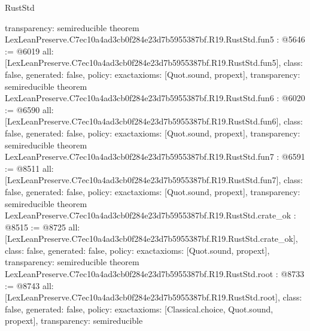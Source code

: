\begin{lexlean}{RustStd}
\begin{coremodule}
{  transparency: semireducible
}
theorem LexLeanPreserve.C7ec10a4ad3cb0f284e23d7b5955387bf.R19.RustStd.fun5 : @5646 := @6019 {
  all: [LexLeanPreserve.C7ec10a4ad3cb0f284e23d7b5955387bf.R19.RustStd.fun5],
  class: false,
  generated: false,
  policy: exact{axioms: [Quot.sound, propext]},
  transparency: semireducible
}
theorem LexLeanPreserve.C7ec10a4ad3cb0f284e23d7b5955387bf.R19.RustStd.fun6 : @6020 := @6590 {
  all: [LexLeanPreserve.C7ec10a4ad3cb0f284e23d7b5955387bf.R19.RustStd.fun6],
  class: false,
  generated: false,
  policy: exact{axioms: [Quot.sound, propext]},
  transparency: semireducible
}
theorem LexLeanPreserve.C7ec10a4ad3cb0f284e23d7b5955387bf.R19.RustStd.fun7 : @6591 := @8511 {
  all: [LexLeanPreserve.C7ec10a4ad3cb0f284e23d7b5955387bf.R19.RustStd.fun7],
  class: false,
  generated: false,
  policy: exact{axioms: [Quot.sound, propext]},
  transparency: semireducible
}
theorem LexLeanPreserve.C7ec10a4ad3cb0f284e23d7b5955387bf.R19.RustStd.crate_ok : @8515 := @8725 {
  all: [LexLeanPreserve.C7ec10a4ad3cb0f284e23d7b5955387bf.R19.RustStd.crate_ok],
  class: false,
  generated: false,
  policy: exact{axioms: [Quot.sound, propext]},
  transparency: semireducible
}
theorem LexLeanPreserve.C7ec10a4ad3cb0f284e23d7b5955387bf.R19.RustStd.root : @8733 := @8743 {
  all: [LexLeanPreserve.C7ec10a4ad3cb0f284e23d7b5955387bf.R19.RustStd.root],
  class: false,
  generated: false,
  policy: exact{axioms: [Classical.choice, Quot.sound, propext]},
  transparency: semireducible
}


\end{coremodule}
\end{lexlean}
